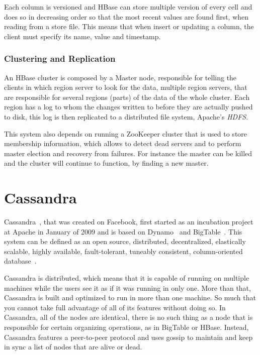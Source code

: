 Each column is versioned and HBase can store multiple version of every cell and does so in decreasing order so that the most recent values are found first, when reading from a store file. This means that when insert or updating a column, the client must specify its name, value and timestamp. 

\subsubsection{Clustering and Replication}
An HBase cluster is composed by a Master node, responsible for telling the clients in which region server to look for the data, multiple region servers, that are responsible for several regions (parts) of the data of the whole cluster. Each region has a log to whom the changes written to before they are actually pushed to disk, this log is then replicated to a distributed file system, Apache's \emph{HDFS}.

This system also depends on running a ZooKeeper cluster that is used to store membership information, which allows to detect dead servers and to perform master election and recovery from failures. For instance the master can be killed and the cluster will continue to function, by finding a new master.

\section{Cassandra}
\label{sec:cassandra}
Cassandra~\cite{will10}, that was created on Facebook, first started as an incubation project at Apache in January of 2009 and is based on Dynamo~\cite{Hastorun2007} and BigTable~\cite{Chang2008}. This system can be defined as an open source, distributed, decentralized, elastically scalable, highly available, fault-tolerant, tuneably consistent, column-oriented database~\cite{hewitt2010cassandra}. 

Cassandra is distributed, which means that it is capable of running on multiple machines while the users see it as if it was running in only one. More than that, Cassandra is built and optimized to run in more than one machine. So much that you cannot take full advantage of all of its features without doing so. In Cassandra, all of the nodes are identical, there is no such thing as a node that is responsible for certain organizing operations, as in BigTable or HBase. Instead, Cassandra features a peer-to-peer protocol and uses gossip to maintain and keep in sync a list of nodes that are alive or dead. 

